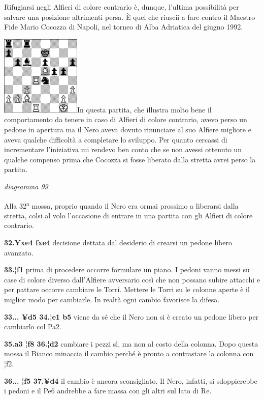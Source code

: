 \documentclass[
]{article}
\begin{document}
Rifugiarsi negli Alfieri di colore contrario è, dunque, l'ultima
possibilità per salvare una posizione altrimenti persa. È quel che
riuscii a fare contro il Maestro Fide Mario Cocozza di Napoli, nel
torneo di Alba Adriatica del giugno 1992.

\includegraphics[width=1.5in,height=1.5in]{vertopal_109f12be458a423d8f3cc838880eaea2/media/image99.png}In
questa partita, che illustra molto bene il comportamento da tenere in
caso di Alfieri di colore contrario, avevo perso un pedone in apertura
ma il Nero aveva dovuto rinunciare al suo Alfiere migliore e aveva
qualche difficoltà a completare lo sviluppo. Per quanto cercassi di
incrementare l'iniziativa mi rendevo ben conto che se non avessi
ottenuto un qualche compenso prima che Cocozza si fosse liberato dalla
stretta avrei perso la partita.

\emph{diagramma 99}

Alla 32\textsuperscript{a} mossa, proprio quando il Nero era ormai
prossimo a liberarsi dalla stretta, colsi al volo l'occasione di entrare
in una partita con gli Alfieri di colore contrario.

\textbf{32.¥xe4 fxe4} decisione dettata dal desiderio di crearsi un
pedone libero avanzato.

\textbf{33.¦f1} prima di procedere occorre formulare un piano. I pedoni
vanno messi su case di colore diverso dall'Alfiere avversario così che
non possano subire attacchi e per pattare occorre cambiare le Torri.
Mettere le Torri su le colonne aperte è il miglior modo per cambiarle.
In realtà ogni cambio favorisce la difesa.

\textbf{33... ¥d5 34.¦e1 b5} viene da sé che il Nero non si è creato un
pedone libero per cambiarlo col Pa2.

\textbf{35.a3 ¦f8 36.¦d2} cambiare i pezzi sì, ma non al costo della
colonna. Dopo questa mossa il Bianco minaccia il cambio perché è pronto
a contrastare la colonna con ¦f2.

\textbf{36... ¦f5 37.¥d4} il cambio è ancora sconsigliato. Il Nero,
infatti, si sdoppierebbe i pedoni e il Pe6 andrebbe a fare massa con gli
altri sul lato di Re.
\end{document}

